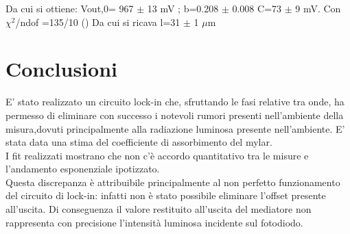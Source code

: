 Da cui si ottiene:
V{out,0}= 967 $\pm$ 13 mV ;  b=0.208 $\pm$ 0.008  C=73 $\pm$ 9 mV. Con $\chi^{2}$/ndof =135/10 ()
Da cui si ricava l=31 $\pm$  1 $\mu$m
\section{Conclusioni}
E' stato realizzato un circuito lock-in che, sfruttando le fasi relative tra onde, ha permesso di eliminare con successo i notevoli rumori presenti nell'ambiente della misura,dovuti principalmente alla radiazione luminosa presente nell'ambiente. E' stata data una stima del coefficiente di assorbimento del mylar. \\
I fit realizzati mostrano che non c'è accordo quantitativo tra le misure e l'andamento esponenziale ipotizzato.\\
Questa discrepanza è attribuibile principalmente al non perfetto funzionamento del circuito di lock-in: infatti non è stato possibile  eliminare l'offset presente all'uscita. Di conseguenza il valore restituito all'uscita del mediatore non rappresenta con precisione l'intensità luminosa incidente sul fotodiodo.\\

